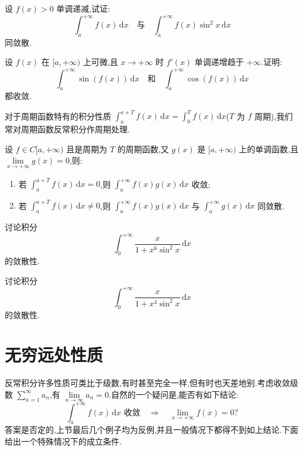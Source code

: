 \documentclass[../数学分析培优讲义.tex]{subfiles}
\begin{document}
\begin{example}
设 $f(x)>0$ 单调递减,试证:
\[
    \int_a^{+\infty}f(x)\,\mathrm{d}x
    \quad\text{与}\quad
    \int_a^{+\infty}f(x)\sin^2x\,\mathrm{d}x
\]
同敛散.
\end{example}
\exampleblank

\begin{example}
设 $f(x)$ 在 $\lbrack a,+\infty)$ 上可微,且 $x\to+\infty$ 时 $f'(x)$ 单调递增趋于 $+\infty$.证明:
\[
    \int_a^{+\infty}\sin(f(x))\,\mathrm{d}x
    \quad\text{和}\quad
    \int_a^{+\infty}\cos(f(x))\,\mathrm{d}x
\]
都收敛.
\end{example}
\exampleblank

对于周期函数特有的积分性质 $\displaystyle\int_a^{a+T}f(x)\,\mathrm{d}x=\int_0^Tf(x)\,\mathrm{d}x$($T$ 为 $f$ 周期),我们常对周期函数反常积分作周期处理.

\begin{example}
设 $f\in C\lbrack a,+\infty)$ 且是周期为 $T$ 的周期函数,又 $g(x)$ 是 $\lbrack a,+\infty)$ 上的单调函数,且 $\displaystyle\lim\limits_{x\to+\infty}g(x)=0$,则:
\begin{enumerate}[label=(\arabic*)]
    \item 若 $\displaystyle\int_a^{a+T}f(x)\,\mathrm{d}x=0$,则 $\displaystyle\int_a^{+\infty}f(x)g(x)\,\mathrm{d}x$ 收敛;
    \item 若 $\displaystyle\int_a^{a+T}f(x)\,\mathrm{d}x\neq0$,则 $\displaystyle\int_a^{+\infty}f(x)g(x)\,\mathrm{d}x$ 与 $\displaystyle\int_a^{+\infty}g(x)\,\mathrm{d}x$ 同敛散.
\end{enumerate}
\end{example}
\exampleblank

\begin{example}[\markstar]
讨论积分
\[
    \int_0^{+\infty}\dfrac{x}{1+x^6\sin^2x}\,\mathrm{d}x
\]
的敛散性.
\end{example}
\exampleblank

\begin{example}[\markstar]
讨论积分
\[
    \int_0^{+\infty}\dfrac{x}{1+x^4\sin^2x}\,\mathrm{d}x
\]
的敛散性.
\end{example}
\exampleblank


\newpage

\section{无穷远处性质}

反常积分许多性质可类比于级数,有时甚至完全一样,但有时也天差地别.考虑收敛级数 $\displaystyle\sum\limits_{n=1}^{\infty}a_n$,有 $\displaystyle\lim\limits_{n\to\infty}a_n=0$.自然的一个疑问是,能否有如下结论:
\[
    \int_a^{+\infty}f(x)\,\mathrm{d}x\text{ 收敛}
    \quad\Longrightarrow\quad
    \lim\limits_{x\to+\infty}f(x)=0?
\]
答案是否定的,上节最后几个例子均为反例,并且一般情况下都得不到如上结论.下面给出一个特殊情况下的成立条件.
\end{document}

